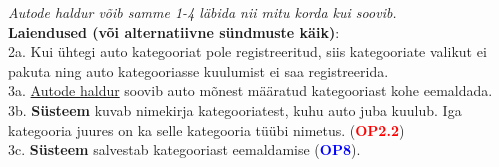 \begin{shaded}
\begin{myenumerate}
	\end{myenumerate}
	\textit{Autode haldur võib samme 1-4 läbida nii mitu korda kui soovib.} \\
	\textbf{Laiendused  (või alternatiivne sündmuste käik)}: \\
	\indent 2a. Kui ühtegi auto kategooriat pole registreeritud, siis kategooriate valikut ei pakuta ning auto kategooriasse kuulumist ei saa registreerida. \\
	\indent 3a. \underline{Autode haldur} soovib auto mõnest määratud kategooriast kohe eemaldada. \\
	\indent 3b. \textbf{Süsteem} kuvab nimekirja kategooriatest, kuhu auto juba kuulub. Iga kategooria juures on ka selle kategooria tüübi nimetus. (\textbf{\textcolor{red}{OP2.2}}) \\
	\indent 3c. \textbf{Süsteem} salvestab kategooriast eemaldamise (\textbf{\textcolor{blue}{OP8}}). \\
\end{shaded}

